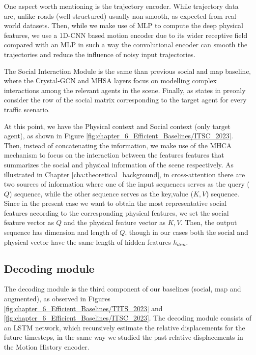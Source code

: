 One aspect worth mentioning is the trajectory encoder. While trajectory data are, unlike roads (well-structured) usually non-smooth, as expected from real-world datasets. Then, while we make use of \ac{MLP} to compute the deep physical features, we use a 1D-\ac{CNN} based motion encoder due to its wider receptive field compared with an \ac{MLP} in such a way the convolutional encoder can smooth the trajectories and reduce the influence of noisy input trajectories.

The Social Interaction Module is the same than previous social and map baseline, where the Crystal-\ac{GCN} and \ac{MHSA} layers focus on modelling complex interactions among the relevant agents in the scene. Finally, as states in preonly consider the row of the social matrix corresponding to the target agent for every traffic scenario.

At this point, we have the Physical context and Social context (only target agent), as shown in Figure \ref{fig:chapter_6_Efficient_Baselines/ITSC_2023}. Then, instead of concatenating the information, we make use of the \ac{MHCA} mechanism to focus on the interaction between the features features that summarizes the social and physical information of the scene respectively. As illustrated in Chapter \ref{cha:theoretical_background}, in cross-attention there are two sources of information where one of the input sequences serves as the query ($Q$) sequence, while the other sequence serves as the key,value ($K,V$) sequence. Since in the present case we want to obtain the most representative social features according to the corresponding physical features, we set the social feature vector as $Q$ and the physical feature vector as $K,V$. Then, the output sequence has dimension and length of $Q$, though in our cases both the social and physical vector have the same length of hidden features $h_{dim}$.

\subsection{Decoding module}
\label{subsubsec:6_efficient_baselines_decoding_modules}

The decoding module is the third component of our baselines (social, map and augmented), as observed in Figures \ref{fig:chapter_6_Efficient_Baselines/TITS_2023} and \ref{fig:chapter_6_Efficient_Baselines/ITSC_2023}. The decoding module consists of an \ac{LSTM} network, which recursively estimate the relative displacements for the future timesteps, in the same way we studied the past relative displacements in the Motion History encoder. 

